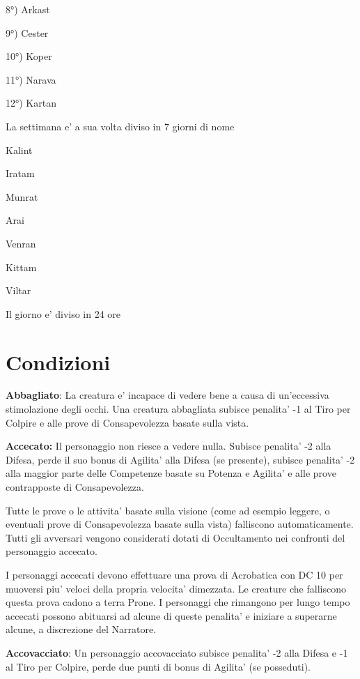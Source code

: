 \documentclass[a4paper,11pt,twoside,openany]{book}
\begin{document}
{8°) Arkast

9°) Cester

10°) Koper

11°) Narava

12°) Kartan

\bigskip
La settimana e' a sua volta diviso in 7 giorni di nome

Kalint

Iratam

Munrat

Arai

Venran

Kittam

Viltar

Il giorno e' diviso in 24 ore

\pagebreak

\section{Condizioni}

\label{condizioni}

\textbf{Abbagliato}: La creatura e' incapace di vedere bene a causa di un'eccessiva stimolazione degli occhi. Una creatura abbagliata subisce penalita' -1 al Tiro per Colpire e alle prove di Consapevolezza basate sulla vista.

\textbf{Accecato:} Il personaggio non riesce a vedere nulla. Subisce penalita' -2 alla Difesa, perde il suo bonus di Agilita' alla Difesa (se presente), subisce penalita' -2 alla maggior parte delle Competenze basate su Potenza e Agilita' e alle prove contrapposte di Consapevolezza.

Tutte le prove o le attivita' basate sulla visione (come ad esempio leggere, o eventuali prove di Consapevolezza basate sulla vista) falliscono automaticamente. Tutti gli avversari vengono considerati dotati di Occultamento nei confronti del personaggio accecato. 

I personaggi accecati devono effettuare una prova di Acrobatica con DC 10 per muoversi piu' veloci della propria velocita' dimezzata. Le creature che falliscono questa prova cadono a terra Prone. I personaggi che rimangono per lungo tempo accecati possono abituarsi ad alcune di queste penalita' e iniziare a superarne alcune, a discrezione del Narratore.

\textbf{Accovacciato}: Un personaggio accovacciato subisce penalita' -2 alla Difesa e -1 al Tiro per Colpire, perde due punti di bonus di Agilita' (se posseduti).

}
\end{document}
